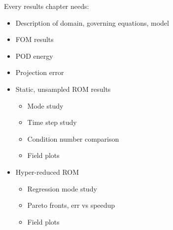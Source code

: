 {\color{red} Every results chapter needs:

\begin{itemize}
	\item Description of domain, governing equations, model
	\item FOM results
	\item POD energy
	\item Projection error
	\item Static, unsampled ROM results
	\begin{itemize}
		\item Mode study
		\item Time step study
		\item Condition number comparison
		\item Field plots
	\end{itemize}
	\item Hyper-reduced ROM
	\begin{itemize}
		\item Regression mode study
		\item Pareto fronts, err vs speedup
		\item Field plots
	\end{itemize}
\end{itemize}

}